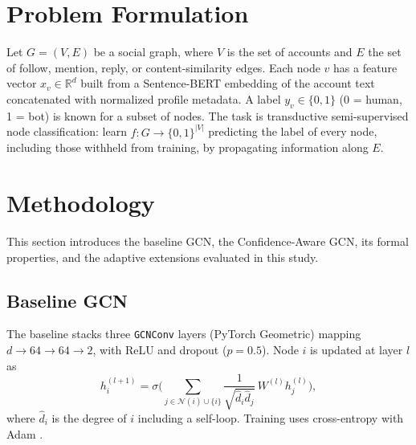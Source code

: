 \documentclass{csimq}
\begin{document}
\section{Problem Formulation}

Let $G=(V,E)$ be a social graph, where $V$ is the set of accounts and $E$ the set of follow, mention, reply, or content-similarity edges. Each node $v$ has a feature vector $x_v\in\mathbb{R}^d$ built from a Sentence-BERT embedding of the account text concatenated with normalized profile metadata. A label $y_v\in\{0,1\}$ (0 = human, 1 = bot) is known for a subset of nodes. The task is transductive semi-supervised node classification: learn $f: G\rightarrow\{0,1\}^{|V|}$ predicting the label of every node, including those withheld from training, by propagating information along $E$.

\section{Methodology}

This section introduces the baseline GCN, the Confidence-Aware GCN, its formal properties, and the adaptive extensions evaluated in this study.

\subsection{Baseline GCN}
The baseline stacks three \texttt{GCNConv} layers (PyTorch Geometric) mapping $d\rightarrow64\rightarrow64\rightarrow2$, with ReLU and dropout ($p=0.5$). Node $i$ is updated at layer $l$ as
\begin{equation}
h_i^{(l+1)}=\sigma\Big(\sum_{j\in\mathcal{N}(i)\cup\{i\}}\frac{1}{\sqrt{\hat d_i\hat d_j}}\,W^{(l)}h_j^{(l)}\Big),
\label{eq:gcn}
\end{equation}
where $\hat d_i$ is the degree of $i$ including a self-loop. Training uses cross-entropy with Adam \cite{kingma2015adam}.
\end{document}
